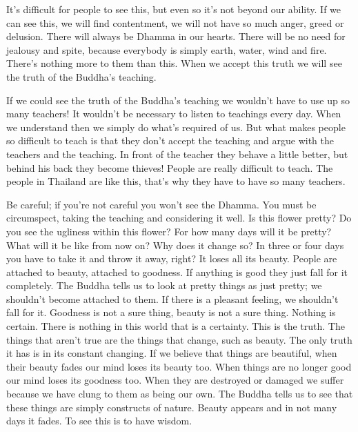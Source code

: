 It's difficult for people to see this, but even so it's not beyond our ability. If we can see this, we will find contentment, we will not have so much anger, greed or delusion. There will always be Dhamma in our hearts. There will be no need for jealousy and spite, because everybody is simply earth, water, wind and fire. There's nothing more to them than this. When we accept this truth we will see the truth of the Buddha's teaching.

If we could see the truth of the Buddha's teaching we wouldn't have to use up so many teachers! It wouldn't be necessary to listen to teachings every day. When we understand then we simply do what's required of us. But what makes people so difficult to teach is that they don't accept the teaching and argue with the teachers and the teaching. In front of the teacher they behave a little better, but behind his back they become thieves! People are really difficult to teach. The people in Thailand are like this, that's why they have to have so many teachers.

Be careful; if you're not careful you won't see the Dhamma. You must be circumspect, taking the teaching and considering it well. Is this flower pretty? Do you see the ugliness within this flower? For how many days will it be pretty? What will it be like from now on? Why does it change so? In three or four days you have to take it and throw it away, right? It loses all its beauty. People are attached to beauty, attached to goodness. If anything is good they just fall for it completely. The Buddha tells us to look at pretty things as just pretty; we shouldn't become attached to them. If there is a pleasant feeling, we shouldn't fall for it. Goodness is not a sure thing, beauty is not a sure thing. Nothing is certain. There is nothing in this world that is a certainty. This is the truth. The things that aren't true are the things that change, such as beauty. The only truth it has is in its constant changing. If we believe that things are beautiful, when their beauty fades our mind loses its beauty too. When things are no longer good our mind loses its goodness too. When they are destroyed or damaged we suffer because we have clung to them as being our own. The Buddha tells us to see that these things are simply constructs of nature. Beauty appears and in not many days it fades. To see this is to have wisdom.


